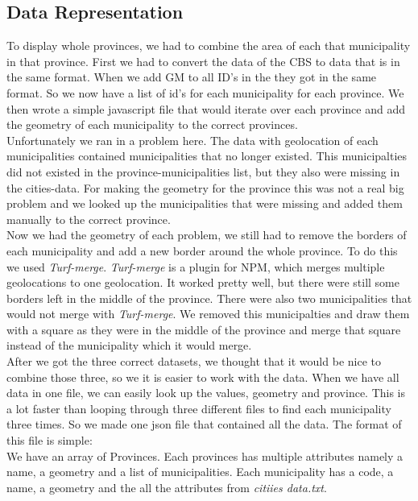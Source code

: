 \subsection{Data Representation}
To display whole provinces, we had to combine the area of each that municipality in that province. First we had to convert the data of the CBS to data that is in the same format. When we add GM to all ID's in the they got in the same format. So we now have a list of id's for each municipality for each province. We then wrote a simple javascript file that would iterate over each province and add the geometry of each municipality to the correct provinces. \\
Unfortunately we ran in a problem here. The data with geolocation of each municipalities contained municipalities that no longer existed. This municipalties did not existed in the province-municipalities list, but they also were missing in the cities-data. For making the geometry for the province this was not a real big problem and we looked up the municipalities that were missing and added them manually to the correct province. \\
Now we had the geometry of each problem, we still had to remove the borders of each municipality and add a new border around the whole province. To do this we used \emph{Turf-merge}.  \emph{Turf-merge} is a plugin for NPM, which merges multiple geolocations to one geolocation. It worked pretty well, but there were still some borders left in the middle of the province. There were also two municipalities that would not merge with \emph{Turf-merge}. We removed this municipalties and draw them with a square as they were in the middle of the province and merge that square instead of the municipality which it would merge. \\
After we got the three correct datasets, we thought that it would be nice to combine those three, so we it is easier to work with the data. When we have all data in one file, we can easily look up the values, geometry and province. This is a lot faster than looping through three different files to find each municipality three times. So we made one json file that contained all the data. The format of this file is simple: \\
We have an array of Provinces. Each provinces has multiple attributes namely a name, a geometry and a list of municipalities. Each municipality has a code, a name, a geometry and the all the attributes from \emph{ citiies data.txt}.
